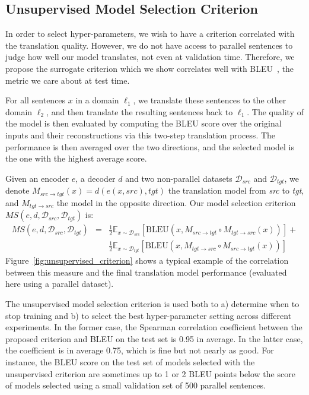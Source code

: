 \documentclass{article} \usepackage{iclr2018_conference,times}
\begin{document}
\subsection{Unsupervised Model Selection Criterion}
\label{sec:unsupervised_criterion}

In order to select hyper-parameters, we wish to have a criterion correlated with the translation quality. However, we do not have access to parallel sentences to judge how well our model translates, not even at validation time. Therefore, we propose the surrogate criterion which we show correlates well with BLEU~\citep{bleu}, the metric we care about at test time.

For all sentences $x$ in a domain $\ell_1$, we translate these sentences to the other domain $\ell_2$, and then translate the resulting sentences back to $\ell_1$. The quality of the model is then evaluated by computing the BLEU score over the original inputs and their reconstructions via this two-step translation process. The performance is then averaged over the two directions, and the selected model is the one with the highest average score. 

Given an encoder $e$, a decoder $d$ and two non-parallel datasets $\mathcal{D}_{src}$ and $\mathcal{D}_{tgt}$, we denote $M_{src \rightarrow tgt}(x) = d(e(x,src),tgt)$ the translation model from \textit{src} to \textit{tgt}, and $M_{tgt \rightarrow src}$ the model in the opposite direction. Our model selection criterion  $MS(e,d,\mathcal{D}_{src},\mathcal{D}_{tgt})$ is:
\begin{eqnarray}
    MS(e,d,\mathcal{D}_{src},\mathcal{D}_{tgt}) &=& \frac{1}{2} 
    \mathbb{E}_{x \sim \mathcal{D}_{src}}\left[ \mathrm{BLEU}(x,M_{src \rightarrow tgt} \circ M_{tgt \rightarrow src}(x) ) \right] + \nonumber \\ 
    & & \frac{1}{2} 
    \mathbb{E}_{x \sim \mathcal{D}_{tgt}}\left[ \mathrm{BLEU}(x,M_{tgt \rightarrow src} \circ M_{src \rightarrow tgt}(x) ) \right] \label{eq:ms}
\end{eqnarray}
Figure~\ref{fig:unsupervised_criterion} shows a typical example of the correlation between this measure and the final translation model performance (evaluated here using a parallel dataset).

The unsupervised model selection criterion is used both to a) determine when to stop training and b) to select the best hyper-parameter setting across different experiments. In the former case, the Spearman correlation coefficient between the proposed criterion and BLEU on the test set is 0.95 in average. In the latter case, the coefficient is in average 0.75, which is fine but not nearly as good. For instance, the BLEU score on the test set of models selected with the unsupervised criterion are sometimes up to 1 or 2 BLEU points below the score of models selected using a small validation set of 500 parallel sentences.
\end{document}

